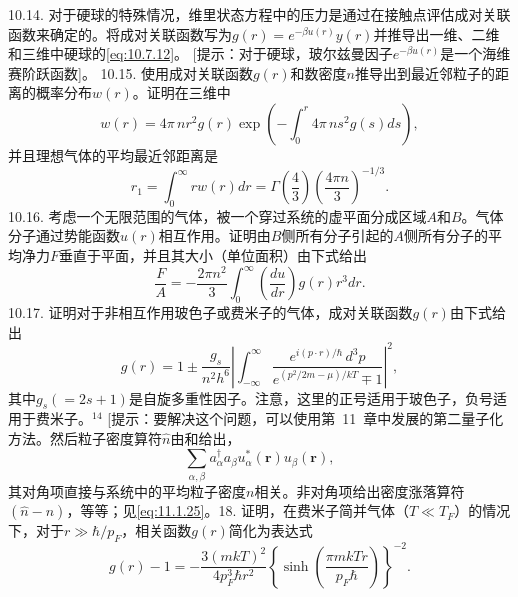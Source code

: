 10.14. 对于硬球的特殊情况，维里状态方程中的压力是通过在接触点评估成对关联函数来确定的。将成对关联函数写为\(g(r)=e^{-\beta u(r)}y(r)\)并推导出一维、二维和三维中硬球的\autoref{eq:10.7.12}。
{[}提示：对于硬球，玻尔兹曼因子\(e^{-\beta u(r)}\)是一个海维赛阶跃函数{]}。
10.15. 使用成对关联函数\(g(r)\)和数密度\(n\)推导出到最近邻粒子的距离的概率分布\(w(r)\)。证明在三维中
\begin{equation}\tag{10.7.42}\label{eq:10.7.42}
w ( r ) = 4 \pi \, n r ^{2} g ( r ) \exp \left( - \int _ { 0 } ^{r} 4 \pi \, n s ^{2} g ( s ) d s \right) ,
\end{equation}
并且理想气体的平均最近邻距离是
\begin{equation}\tag{10.7.43}\label{eq:10.7.43}
r _ { 1 } = \int _ { 0 } ^{\infty} r w ( r ) d r = \Gamma \left( \frac { 4 } { 3 } \right) \left( \frac { 4 \pi n } { 3 } \right) ^{- 1 / 3} .
\end{equation}
10.16. 考虑一个无限范围的气体，被一个穿过系统的虚平面分成区域\(A\)和\(B\)。气体分子通过势能函数\(u(r)\)相互作用。证明由\(B\)侧所有分子引起的\(A\)侧所有分子的平均净力\(F\)垂直于平面，并且其大小（单位面积）由下式给出
\begin{equation}\tag{10.7.44}\label{eq:10.7.44}
\frac { F } { A } = - \frac { 2 \pi n ^{2} } { 3 } \int _ { 0 } ^{\infty} \left( \frac { d u } { d r } \right) g ( r ) r ^{3} d r .
\end{equation}
10.17. 证明对于非相互作用玻色子或费米子的气体，成对关联函数\(g(r)\)由下式给出
\begin{equation}\tag{10.7.45}\label{eq:10.7.45}
g ( r ) = 1 \pm \frac { g _ { s } } { n ^{2} h ^{6} } \left| \int _ { - \infty } ^{\infty} \frac { e ^{i ( p \cdot r ) / \hbar} \, d ^{3} p } { e ^{( p ^ { 2} / 2 m - \mu ) / k T } \mp 1 } \right| ^{2} ,
\end{equation}
其中\(g_{s}(=2s+1)\)是自旋多重性因子。注意，这里的正号适用于玻色子，负号适用于费米子。\(^{14}\)
{[}提示：要解决这个问题，可以使用第~11~章中发展的第二量子化方法。然后粒子密度算符\(\hat{n}\)由和给出，
\begin{equation}\tag{10.7.46}\label{eq:10.7.46}
\sum _ { \alpha , \beta } a _ { \alpha } ^{\dagger} a _ { \beta } u _ { \alpha } ^{*} ( \boldsymbol { r } ) u _ { \beta } ( \boldsymbol { r } ) ,
\end{equation}
其对角项直接与系统中的平均粒子密度\(n\)相关。非对角项给出密度涨落算符\((\hat{n}-n)\)，等等；见\autoref{eq:11.1.25}。18. 证明，在费米子简并气体（\(T\ll T_{F}\)）的情况下，对于\(r\gg\hbar/p_{F}\)，相关函数\(g(r)\)简化为表达式
\begin{equation}\tag{10.7.47}\label{eq:10.7.47}
g ( r ) - 1 = - \frac { 3 ( m k T ) ^{2} } { 4 p _ { F } ^{3} \hbar r ^{2} } \left\{ \sinh \left( \frac { \pi m k T r } { p _ { F } \hbar } \right) \right\} ^{- 2} .
\end{equation}
